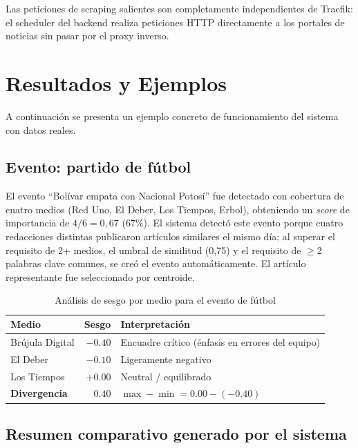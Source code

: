 \documentclass[12pt,a4paper]{article}
\begin{document}
Las peticiones de scraping salientes son completamente independientes de Traefik: el scheduler del backend realiza peticiones HTTP directamente a los portales de noticias sin pasar por el proxy inverso.

\section{Resultados y Ejemplos}

A continuación se presenta un ejemplo concreto de funcionamiento del sistema con datos reales.

\subsection*{Evento: partido de fútbol}

El evento ``Bolívar empata con Nacional Potosí'' fue detectado con cobertura de cuatro medios (Red Uno, El Deber, Los Tiempos, Erbol), obteniendo un \textit{score} de importancia de $4/6 = 0{,}67$ (67\%). El sistema detectó este evento porque cuatro redacciones distintas publicaron artículos similares el mismo día; al superar el requisito de 2+ medios, el umbral de similitud (0,75) y el requisito de $\geq$2 palabras clave comunes, se creó el evento automáticamente. El artículo representante fue seleccionado por centroide.

\begin{table}[h]
\centering
\caption{Análisis de sesgo por medio para el evento de fútbol}
\begin{tabular}{@{}lrl@{}}
\toprule
\rowcolor{azulAS!15}
\textbf{Medio} & \textbf{Sesgo} & \textbf{Interpretación} \\
\midrule
Brújula Digital & $-0.40$ & Encuadre crítico (énfasis en errores del equipo) \\
\rowcolor{grisCelda}
El Deber         & $-0.10$ & Ligeramente negativo \\
Los Tiempos      & $+0.00$ & Neutral / equilibrado \\
\midrule
\rowcolor{grisCelda}
\textbf{Divergencia} & $\mathbf{0.40}$ & $\max - \min = 0.00 - (-0.40)$ \\
\bottomrule
\end{tabular}
\end{table}

\subsection*{Resumen comparativo generado por el sistema}
\end{document}
